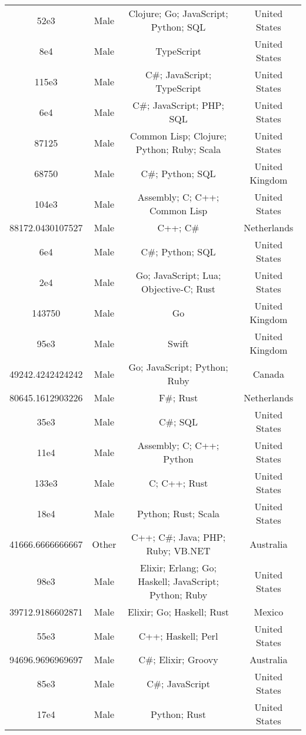 \begin{center}
\begin{tabular}{ |c|c|c|c| }
52e3  &  Male  &  Clojure; Go; JavaScript; Python; SQL  &  United States  \\ 
8e4  &  Male  &  TypeScript  &  United States  \\ 
115e3  &  Male  &  C\#; JavaScript; TypeScript  &  United States  \\ 
6e4  &  Male  &  C\#; JavaScript; PHP; SQL  &  United States  \\ 
87125  &  Male  &  Common Lisp; Clojure; Python; Ruby; Scala  &  United States  \\ 
68750  &  Male  &  C\#; Python; SQL  &  United Kingdom  \\ 
104e3  &  Male  &  Assembly; C; C++; Common Lisp  &  United States  \\ 
88172.0430107527  &  Male  &  C++; C\#  &  Netherlands  \\ 
6e4  &  Male  &  C\#; Python; SQL  &  United States  \\ 
2e4  &  Male  &  Go; JavaScript; Lua; Objective-C; Rust  &  United States  \\ 
143750  &  Male  &  Go  &  United Kingdom  \\ 
95e3  &  Male  &  Swift  &  United Kingdom  \\ 
49242.4242424242  &  Male  &  Go; JavaScript; Python; Ruby  &  Canada  \\ 
80645.1612903226  &  Male  &  F\#; Rust  &  Netherlands  \\ 
35e3  &  Male  &  C\#; SQL  &  United States  \\ 
11e4  &  Male  &  Assembly; C; C++; Python  &  United States  \\ 
133e3  &  Male  &  C; C++; Rust  &  United States  \\ 
18e4  &  Male  &  Python; Rust; Scala  &  United States  \\ 
41666.6666666667  &  Other  &  C++; C\#; Java; PHP; Ruby; VB.NET  &  Australia  \\ 
98e3  &  Male  &  Elixir; Erlang; Go; Haskell; JavaScript; Python; Ruby  &  United States  \\ 
39712.9186602871  &  Male  &  Elixir; Go; Haskell; Rust  &  Mexico  \\ 
55e3  &  Male  &  C++; Haskell; Perl  &  United States  \\ 
94696.9696969697  &  Male  &  C\#; Elixir; Groovy  &  Australia  \\ 
85e3  &  Male  &  C\#; JavaScript  &  United States  \\ 
17e4  &  Male  &  Python; Rust  &  United States  \\ 

\end{tabular}
\end{center}

